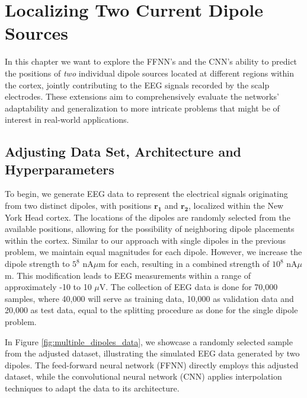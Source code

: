\documentclass[a4paper, UKenglish, 11pt]{uiomaster}
\begin{document}
\chapter{Localizing Two Current Dipole Sources}
In this chapter we want to explore the FFNN's and the CNN's ability to predict the positions of \emph{two} individual dipole sources located at different regions within the cortex, jointly contributing to the EEG signals recorded by the scalp electrodes. These extensions aim to comprehensively evaluate the networks' adaptability and generalization to more intricate problems that might be of interest in real-world applications.


\section{Adjusting Data Set, Architecture and Hyperparameters}
To begin, we generate EEG data to represent the electrical signals originating from two distinct dipoles, with positions $\mathbf{r_1}$ and $\mathbf{r_2}$, localized within the New York Head cortex. The locations of the dipoles are randomly selected from the available positions, allowing for the possibility of neighboring dipole placements within the cortex. Similar to our approach with single dipoles in the previous problem, we maintain equal magnitudes for each dipole. However, we increase the dipole strength to $5^8$ nA$\mu$m for each, resulting in a combined strength of $10^8$ nA$\mu$m. This modification leads to EEG measurements within a range of approximately -10 to 10 $\mu$V. The collection of EEG data is done for 70,000 samples, where 40,000 will serve as training data, 10,000 as validation data and 20,000 as test data, equal to the splitting procedure as done for the single dipole problem.

In Figure \ref{fig:multiple_dipoles_data}, we showcase a randomly selected sample from the adjusted dataset, illustrating the simulated EEG data generated by two dipoles. The feed-forward neural network (FFNN) directly employs this adjusted dataset, while the convolutional neural network (CNN) applies interpolation techniques to adapt the data to its architecture.
\end{document}
